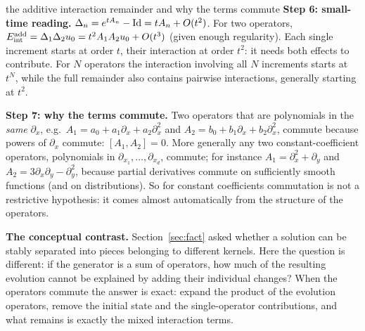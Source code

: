 \begin{explained}{the additive interaction remainder and why the terms commute}
\medskip\textbf{Step 6: small-time reading.} $\Delta_n=e^{tA_n}-\mathrm{Id}=tA_n+O(t^2)$. For two operators, $E_{\mathrm{int}}^{\mathrm{add}}=\Delta_1\Delta_2u_0=t^2A_1A_2u_0+O(t^3)$ (given enough regularity). Each single increment starts at order $t$, their interaction at order $t^2$: it needs both effects to contribute. For $N$ operators the interaction involving all $N$ increments starts at $t^N$, while the full remainder also contains pairwise interactions, generally starting at $t^2$.

\medskip\textbf{Step 7: why the terms commute.} Two operators that are polynomials in the \emph{same} $\partial_x$, e.g.\ $A_1=a_0+a_1\partial_x+a_2\partial_x^2$ and $A_2=b_0+b_1\partial_x+b_2\partial_x^2$, commute because powers of $\partial_x$ commute: $[A_1,A_2]=0$. More generally any two constant-coefficient operators, polynomials in $\partial_{x_1},\dots,\partial_{x_d}$, commute; for instance $A_1=\partial_x^2+\partial_y$ and $A_2=3\partial_x\partial_y-\partial_y^2$, because partial derivatives commute on sufficiently smooth functions (and on distributions). So for constant coefficients commutation is not a restrictive hypothesis: it comes almost automatically from the structure of the operators.

\medskip\textbf{The conceptual contrast.} Section~\ref{sec:fact} asked whether a solution can be stably separated into pieces belonging to different kernels. Here the question is different: if the generator is a sum of operators, how much of the resulting evolution cannot be explained by adding their individual changes? When the operators commute the answer is exact: expand the product of the evolution operators, remove the initial state and the single-operator contributions, and what remains is exactly the mixed interaction terms.
\end{explained}


